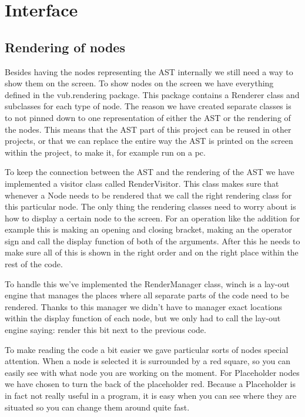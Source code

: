 \documentclass[a4paper,12pt]{report}
\begin{document}
\section{Interface}
\subsection{Rendering of nodes}
Besides having the nodes representing the AST internally we still need a way to show them on the screen. To show nodes on the screen we have everything defined in the vub.rendering package. This package contains a Renderer 
class and subclasses for each type of node. The reason we have created separate classes is to not pinned down to one representation of either the AST or the rendering of the nodes. This means that the AST part of this project
can be reused in other projects, or that we can replace the entire way the AST is printed on the screen within the project, to make it, for example run on a pc.

To keep the connection between the AST and the rendering of the AST we have implemented a visitor class called RenderVisitor. This class makes sure that whenever a Node needs to be rendered that we call the right
rendering class for this particular node. The only thing the rendering classes need to worry about is how to display a certain node to the screen. For an operation like the addition for example this is making an opening and
 closing bracket, making an the operator sign and call the display function of both of the arguments. After this he needs to make sure all of this is shown in the right order and on the right place within the rest of 
the code. 

To handle this we've implemented the RenderManager class, winch is a lay-out engine that manages the places where all separate parts of the code need to be rendered. Thanks to this manager we didn't have to manager 
exact locations within the display function of each node, but we only had to call the lay-out engine saying: render this bit next to the previous code. 

To make reading the code a bit easier we gave particular sorts of nodes special attention. When a node is selected it is surrounded by a red square, so you can easily see with what node you are working on the moment. For Placeholder
nodes we have chosen to turn the back of the placeholder red. Because a Placeholder is in fact not really useful in a program, it is easy when you can see where they are situated so you can change them around quite fast.
\end{document}
